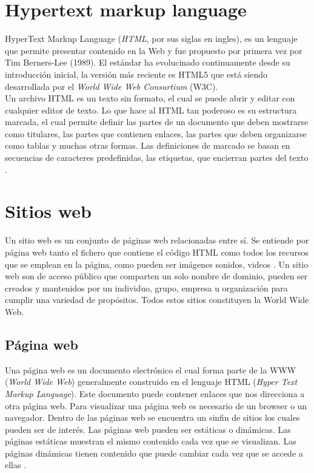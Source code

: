 
\section[HTML]{Hypertext markup language}
HyperText Markup Language (\textit{HTML}, por sus siglas en ingles), 
es un lenguaje que permite presentar contenido en la Web y fue propuesto por primera vez por 
Tim Berners-Lee (1989). El estándar ha evolucinado continuamente desde su introducción inicial, 
la versión más reciente es HTML5 que está siendo desarrollada por el \textit{World Wide Web Consurtium} (W3C).
\\
Un archivo HTML es un texto sin formato, el cual se puede abrir y editar con cualquier editor de 
texto. Lo que hace al HTML tan poderoso es su estructura marcada, el cual permite definir las partes 
de un documento que deben mostrarse como titulares, las partes que contienen enlaces, las partes que deben 
organizarse como tablas y muchas otras formas. Las definiciones de marcado se basan en secuencias de caracteres 
predefinidas, las etiquetas, que encierran partes del texto \citep{CTHTML}. 


\section{Sitios web}
Un sitio web es un conjunto de páginas web relacionadas entre sí. Se entiende por página web tanto el fichero 
que contiene el código HTML como todos los recursos que se emplean en la página, como pueden ser
imágenes sonidos, videos \citep{CTsW}.
Un sitio web son de acceso público que comparten un solo nombre de dominio, pueden ser creados y 
mantenidos por un individuo, grupo, empresa u organización para cumplir una variedad de propósitos. 
Todos estos sitios constituyen la World Wide Web. 


\subsection{Página web}

Una página web es un documento electrónico el cual forma parte de la WWW (\textit{World Wide Web}) generalmente 
construido en el lenguaje HTML (\textit{Hyper Text Markup Language}). Este documento puede contener enlaces que nos 
direcciona a otra página web. Para visualizar una página web es necesario de un browser o un navegador. 
Dentro de las páginas web se encuentra un sinfin de sitios los cuales pueden ser de interés. 
Las páginas web pueden ser estáticas o dinámicas. Las páginas estáticas muestran el mismo contenido cada vez que se 
visualizan. Las páginas dinámicas tienen contenido que puede cambiar cada vez que se accede a ellas \citep{CTpW}. 

